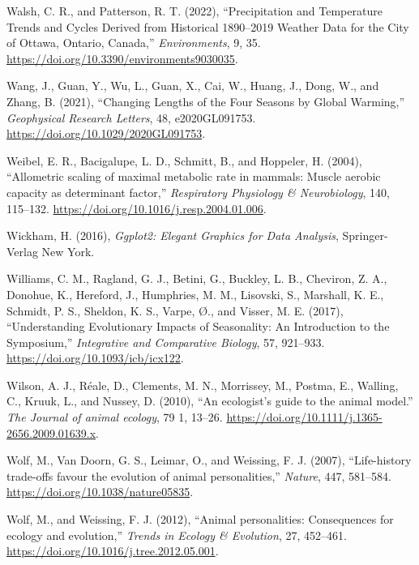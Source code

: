\documentclass[
  12pt,
  letterpaper,
]{scrartcl}
\newlength{\cslhangindent}
\newenvironment{CSLReferences}[2] %
 {\begin{list}{}{%
  \setlength{\itemindent}{0pt}
  \setlength{\leftmargin}{0pt}
  \setlength{\parsep}{0pt}
  \ifodd #1
   \setlength{\leftmargin}{\cslhangindent}
   \setlength{\itemindent}{-1\cslhangindent}
  \fi
  \setlength{\itemsep}{#2\baselineskip}}}
 {\end{list}}
\begin{document}
\begin{CSLReferences}{1}{0}
Walsh, C. R., and Patterson, R. T. (2022), {``Precipitation and
{Temperature Trends} and {Cycles Derived} from {Historical} 1890--2019
{Weather Data} for the {City} of {Ottawa}, {Ontario}, {Canada},''}
\emph{Environments}, 9, 35.
\url{https://doi.org/10.3390/environments9030035}.

Wang, J., Guan, Y., Wu, L., Guan, X., Cai, W., Huang, J., Dong, W., and
Zhang, B. (2021), {``Changing {Lengths} of the {Four Seasons} by {Global
Warming},''} \emph{Geophysical Research Letters}, 48, e2020GL091753.
\url{https://doi.org/10.1029/2020GL091753}.

Weibel, E. R., Bacigalupe, L. D., Schmitt, B., and Hoppeler, H. (2004),
{``Allometric scaling of maximal metabolic rate in mammals: {Muscle}
aerobic capacity as determinant factor,''} \emph{Respiratory Physiology
\& Neurobiology}, 140, 115--132.
\url{https://doi.org/10.1016/j.resp.2004.01.006}.

Wickham, H. (2016), \emph{Ggplot2: {Elegant Graphics} for {Data
Analysis}}, Springer-Verlag New York.

Williams, C. M., Ragland, G. J., Betini, G., Buckley, L. B., Cheviron,
Z. A., Donohue, K., Hereford, J., Humphries, M. M., Lisovski, S.,
Marshall, K. E., Schmidt, P. S., Sheldon, K. S., Varpe, Ø., and Visser,
M. E. (2017), {``Understanding {Evolutionary Impacts} of {Seasonality}:
{An Introduction} to the {Symposium},''} \emph{Integrative and
Comparative Biology}, 57, 921--933.
\url{https://doi.org/10.1093/icb/icx122}.

Wilson, A. J., Réale, D., Clements, M. N., Morrissey, M., Postma, E.,
Walling, C., Kruuk, L., and Nussey, D. (2010), {``An ecologist's guide
to the animal model.''} \emph{The Journal of animal ecology}, 79 1,
13--26. \url{https://doi.org/10.1111/j.1365-2656.2009.01639.x}.

Wolf, M., Van Doorn, G. S., Leimar, O., and Weissing, F. J. (2007),
{``Life-history trade-offs favour the evolution of animal
personalities,''} \emph{Nature}, 447, 581--584.
\url{https://doi.org/10.1038/nature05835}.

Wolf, M., and Weissing, F. J. (2012), {``Animal personalities:
{Consequences} for ecology and evolution,''} \emph{Trends in Ecology \&
Evolution}, 27, 452--461.
\url{https://doi.org/10.1016/j.tree.2012.05.001}.


\end{CSLReferences}
\end{document}
